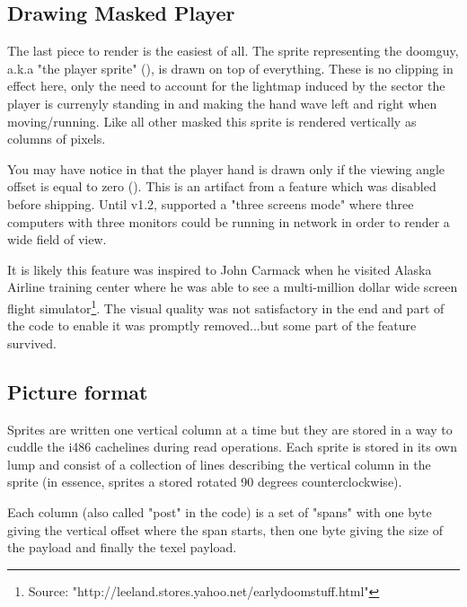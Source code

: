 \subsection{Drawing Masked Player}
The last piece to render is the easiest of all. The sprite representing the doomguy, a.k.a "the player sprite" (), is drawn on top of everything. These is no clipping in effect here, only the need to account for the lightmap induced by the sector the player is currenyly standing in and making the hand wave left and right when moving/running. Like all other masked this sprite is rendered vertically as columns of pixels.\\
\par
You may have notice in  that the player hand is drawn only if the viewing angle offset is equal to zero (). This is an artifact from a feature which was disabled before shipping. Until v1.2, \doom{} supported a "three screens mode" where three computers with three monitors could be running in network in order to render a wide field of view.\\
\par
{}
\par
It is likely this feature was inspired to John Carmack when he visited Alaska Airline training center where he was able to see a multi-million dollar wide screen flight simulator\footnote{Source: "http://leeland.stores.yahoo.net/earlydoomstuff.html"}. The visual quality was not satisfactory in the end and part of the code to enable it was promptly removed...but some part of the feature survived.\\
\par

\subsection{Picture format}
Sprites are written one vertical column at a time but they are stored in a way to cuddle the i486 cachelines during read operations. Each sprite is stored in its own lump and consist of a collection of lines describing the vertical column in the sprite (in essence, sprites a stored rotated 90 degrees counterclockwise).\\
\par
Each column (also called "post" in the code) is a set of "spans" with one byte giving the vertical offset where the span starts, then one byte giving the size of the payload and finally the texel payload.
\pagebreak


